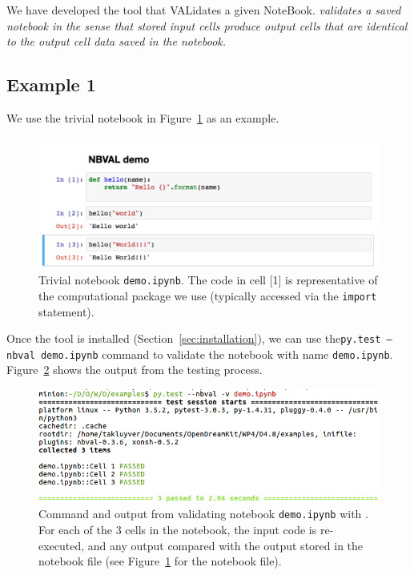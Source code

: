 \documentclass{deliverablereport}
\begin{document}
We have developed the \nbval tool that VALidates a given
NoteBook. \emph{\nbval validates a saved notebook in the sense that stored
input cells produce output cells that are identical to the output cell
data saved in the notebook.}

\subsection{Example 1}
We use the trivial notebook in Figure~\ref{fig:demo-ipynb} as an
example.

\begin{figure}[ht]
  \centering
  \includegraphics[width=1\textwidth]{examples/demo.png}
  \caption{Trivial notebook \texttt{demo.ipynb}. The code in cell [1] is
    representative of the computational package we use (typically
    accessed via the \texttt{import} statement).\label{fig:demo-ipynb}}
\end{figure}

Once the \nbval tool is installed (Section~\ref{sec:installation}), we
can use the\linebreak \texttt{py.test --nbval demo.ipynb} command to
validate the notebook with name
\texttt{demo.ipynb}. Figure~\ref{fig:demo-pytest} shows the output
from the testing process.

\begin{figure}[ht]
  \centering
  \includegraphics[width=1\textwidth]{examples/demo-pytest.png}
  \caption{\nbval Command and output from validating notebook
    \texttt{demo.ipynb} with \nbval. For each of the 3 cells in the notebook,
    the input code is re-executed, and any output compared with the
    output stored in the notebook file (see
    Figure~\ref{fig:demo-ipynb} for the notebook file).\label{fig:demo-pytest}}
\end{figure}
\end{document}
